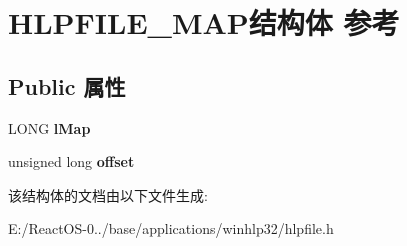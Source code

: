 \hypertarget{struct_h_l_p_f_i_l_e___m_a_p}{}\section{H\+L\+P\+F\+I\+L\+E\+\_\+\+M\+A\+P结构体 参考}
\label{struct_h_l_p_f_i_l_e___m_a_p}
\subsection*{Public 属性}
\begin{DoxyCompactItemize}
\item 
\mbox{\label{struct_h_l_p_f_i_l_e___m_a_p_a78993305822d2aea136d76eb0ee05b32}} 
L\+O\+NG {\bfseries l\+Map}
\item 
\mbox{\label{struct_h_l_p_f_i_l_e___m_a_p_adfc937efe05572711fb61497cc1d6e76}} 
unsigned long {\bfseries offset}
\end{DoxyCompactItemize}


该结构体的文档由以下文件生成\+:\begin{DoxyCompactItemize}
\item 
E\+:/\+React\+O\+S-\/0../base/applications/winhlp32/hlpfile.\+h\end{DoxyCompactItemize}
